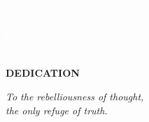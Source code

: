 \textcolor{white}{
hola \\
hola \\
hola \\
hola \\
}
\begin{flushright}
\LARGE{\textbf{DEDICATION}}
\end{flushright}


\begin{flushright}
\textit{To the rebelliousness of thought, \\
the only refuge of truth.}
\end{flushright}
